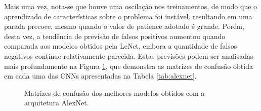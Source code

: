 Mais uma vez, nota-se que houve uma oscilação nos treinamentos, de modo que o aprendizado de características sobre o problema foi instável, resultando em uma parada precoce, mesmo quando o valor de patience adotado é grande. Porém, desta vez, a tendência de previsão de falsos positivos aumentou quando comparada aos modelos obtidos pela LeNet, embora a quantidade de falsos negativos continue relativamente parecida. Estas previsões podem ser analisadas mais profundamente na Figura \ref{fig:matrizes-alexnet}, que demonstra as matrizes de confusão obtida em cada uma das CNNs apresentadas na Tabela \ref{tab:alexnet}.

\begin{figure}[H]
	\centering
	\caption{Matrizes de confusão dos melhores modelos obtidos com a arquitetura AlexNet.}
	\hfill
	\label{fig:matrizes-alexnet}
\end{figure}

